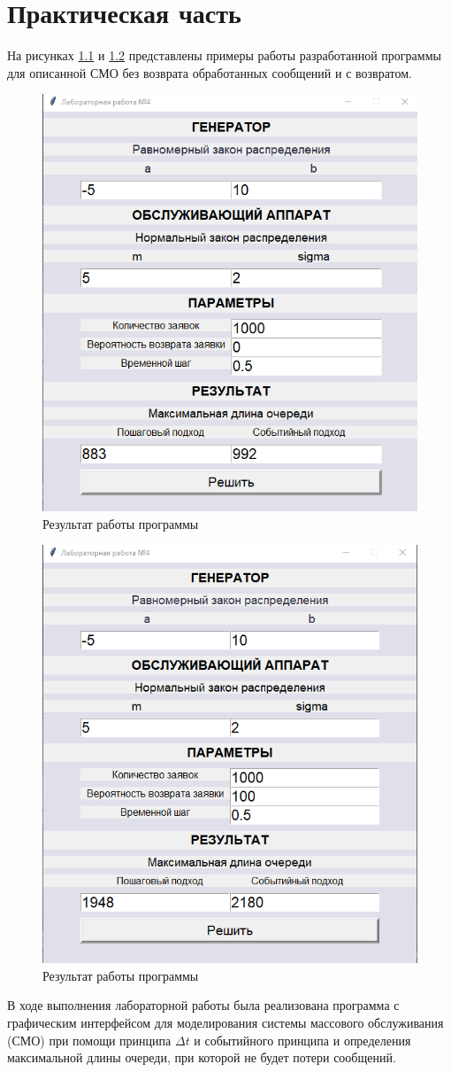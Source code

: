 \chapter{Практическая часть}

На рисунках \ref{img:example-1} и \ref{img:example-2} представлены примеры работы разработанной программы для описанной СМО без возврата обработанных сообщений и с возвратом.

\begin{figure}[ht!]
	\centering
	\includegraphics[width=0.6\linewidth]{img/res-1.png}
	\caption{Результат работы программы}
	\label{img:example-1}
\end{figure}

\clearpage

\begin{figure}[ht!]
	\centering
	\includegraphics[width=0.6\linewidth]{img/res.png}
	\caption{Результат работы программы}
	\label{img:example-2}
\end{figure}

В ходе выполнения лабораторной работы была реализована программа с графическим интерфейсом для моделирования системы массового обслуживания (СМО) при помощи принципа $\Delta t$ и событийного принципа и определения максимальной длины очереди, при которой не будет потери сообщений. 


